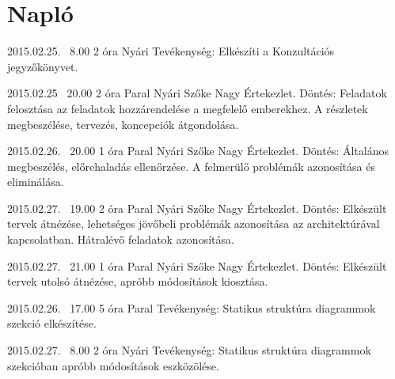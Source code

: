 %
\section{Napló}

\begin{naplo}
	
	\bejegyzes
	{2015.02.25. ~8.00}
	{2 óra}
	{Nyári} 
	{Tevékenység: Elkészíti a Konzultációs jegyzőkönyvet.\newline } 
	
	
	\bejegyzes
	{2015.02.25 ~20.00}
	{2 óra}
	{Paral \newline Nyári \newline Szőke \newline Nagy} 
	{Értekezlet.
		Döntés: Feladatok felosztása az feladatok hozzárendelése a megfelelő emberekhez. A részletek megbeszélése, tervezés, koncepciók átgondolása.\newline } 
	
	\bejegyzes
	{2015.02.26. ~20.00}
	{1 óra}
	{Paral \newline Nyári \newline Szőke \newline Nagy} 
	{Értekezlet.
		Döntés: Általános megbeszélés, előrehaladás ellenőrzése. A felmerülő problémák azonosítása és eliminálása. \newline } 
	
	\bejegyzes
	{2015.02.27. ~19.00}
	{2 óra}
	{Paral \newline Nyári \newline Szőke \newline Nagy} 
	{Értekezlet.
		Döntés: Elkészült tervek átnézése, lehetséges jövőbeli problémák azonosítása az architektúrával kapcsolatban. Hátralévő feladatok azonosítása.\newline } 
	
	\bejegyzes
	{2015.02.27. ~21.00}
	{1 óra}
	{Paral \newline Nyári \newline Szőke \newline Nagy} 
	{Értekezlet.
		Döntés: Elkészült tervek utolsó átnézése, apróbb módosítások kiosztása.\newline } 
	
	\bejegyzes
	{2015.02.26. ~17.00}
	{5 óra}
	{Paral} 
	{Tevékenység: Statikus struktúra diagrammok szekció elkészítése.\newline } 
	
	\bejegyzes
	{2015.02.27. ~8.00}
	{2 óra}
	{Nyári} 
	{Tevékenység: Statikus struktúra diagrammok szekcióban apróbb módosítások eszközölése.\newline } 
	

\end{naplo}
